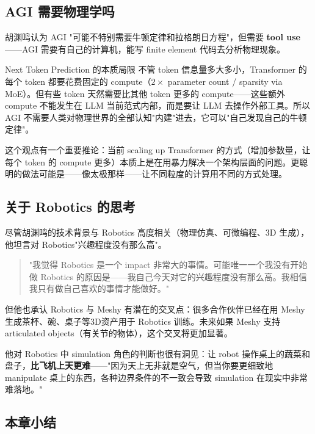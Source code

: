 \documentclass[a4paper]{article}
\begin{document}
\subsection{AGI 需要物理学吗}

胡渊鸣认为 AGI "可能不特别需要牛顿定律和拉格朗日方程"，但需要 \textbf{tool use}——AGI 需要有自己的计算机，能写 finite element 代码去分析物理现象。

\begin{knowledgebox}{Next Token Prediction 的本质局限}
不管 token 信息量多大多小，Transformer 的每个 token 都要花费固定的 compute（$2 \times$ parameter count / sparsity via MoE）。但有些 token 天然需要比其他 token 更多的 compute——这些额外 compute 不能发生在 LLM 当前范式内部，而是要让 LLM 去操作外部工具。所以 AGI 不需要人类对物理世界的全部认知"内建"进去，它可以"自己发现自己的牛顿定律"。
\end{knowledgebox}

这个观点有一个重要推论：当前 scaling up Transformer 的方式（增加参数量，让每个 token 的 compute 更多）本质上是在用暴力解决一个架构层面的问题。更聪明的做法可能是——像太极那样——让不同粒度的计算用不同的方式处理。

\subsection{关于 Robotics 的思考}

尽管胡渊鸣的技术背景与 Robotics 高度相关（物理仿真、可微编程、3D 生成），他坦言对 Robotics"兴趣程度没有那么高"。

\begin{quote}
"我觉得 Robotics 是一个 impact 非常大的事情。可能唯一一个我没有开始做 Robotics 的原因是——我自己今天对它的兴趣程度没有那么高。我相信我只有做自己喜欢的事情才能做好。"
\end{quote}

但他也承认 Robotics 与 Meshy 有潜在的交叉点：很多合作伙伴已经在用 Meshy 生成茶杯、碗、桌子等3D资产用于 Robotics 训练。未来如果 Meshy 支持 articulated objects（有关节的物体），这个交叉将更加显著。

他对 Robotics 中 simulation 角色的判断也很有洞见：让 robot 操作桌上的蔬菜和盘子，\textbf{比飞机上天更难}——"因为天上无非就是空气，但当你要更细致地 manipulate 桌上的东西，各种边界条件的不一致会导致 simulation 在现实中非常难落地。"

\subsection{本章小结}
\end{document}
